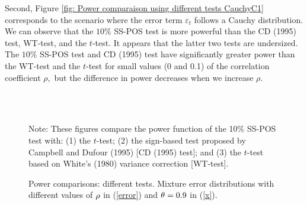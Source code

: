 \documentclass[harvard,11pt]{article}
\begin{document}
Second, Figure \ref{fig: Power comparaison using different tests CauchyC1}
corresponds to the scenario where the error term $\varepsilon _{t}$ follows a
Cauchy distribution. We can observe that the $10\%$ SS-POS test is more
powerful than the CD (1995) test, WT-test, and the $t$-test. It appears that the latter two
tests are undersized.  The $10\%$ SS-POS test and CD (1995) test have significantly greater power
than the WT-test and the $t$-test for small values (0 and 0.1) of the correlation
coefficient $\rho ,$ but the difference in power decreases when we increase $%
\rho $. 
\begin{figure}[tbph]
\caption{Power comparisons: different tests. Mixture error distributions
with different values of $\protect\rho $ in (\protect\ref{error}) and $%
\protect\theta =0.9$ in (\protect\ref{x}).}
\begin{center}
 \\[0pt]
\\[0pt]
\end{center}

Note: These figures compare the power
function of the 10\% SS-POS test with: (1) the $t$-test; (2) the sign-based test
proposed by Campbell and Dufour (1995) [CD (1995) test]; and (3) the $t$-test based
on White's (1980) variance correction [WT-test]. 
\label{fig: Power comparaison using different tests MixtureC1}
\end{figure}
\end{document}
